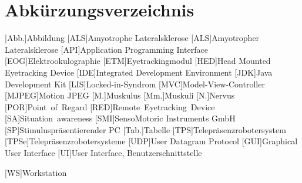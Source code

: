 \chapter*{Abkürzungsverzeichnis}

\begin{acronym}[[TDMA]
[Abb.]{Abbildung}
[ALS]{Amyotrophe Lateralsklerose}
[ALS]{Amyotropher Lateralsklerose}
[API]{Application Programming Interface}
[EOG]{Elektro\-okulographie}
[ETM]{Eye\-tracking\-modul}
[HED]{Head Mounted Eyetracking Device}
[IDE]{Integrated Development Environment}
[JDK]{Java Development Kit}
[LIS]{Locked-in-Syndrom}
[MVC]{Model-View-Controller}
[MJPEG]{Motion JPEG}
[M.]{Muskulus}
[Mm.]{Muskuli}
[N.]{Nervus}
[POR]{Point~of~Regard}
[RED]{Remote~Eyetracking~Device}
[SA]{Situation~awareness} 
[SMI]{SensoMotoric Instruments GmbH}
[SP]{Stimulus\-präsentierender PC}
[Tab.]{Tabelle}
[TPS]{Telepräsenz\-roboter\-system}
[TPSe]{Telepräsenz\-roboter\-systeme}
[UDP]{User Datagram Protocol}
[GUI]{Graphical User Interface}
[UI]{User Interface, Benutzerschnittstelle}


[WS]{Workstation}
\end{acronym}

